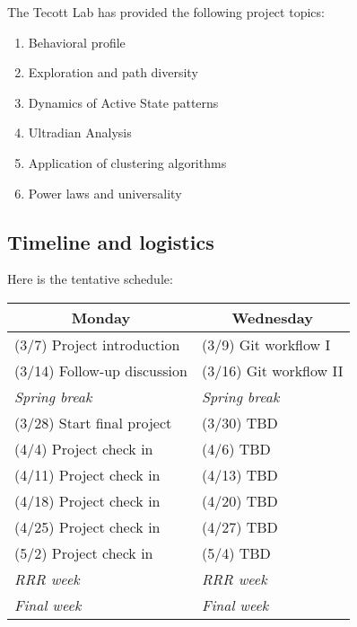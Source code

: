 \documentclass[11pt, oneside]{article}   	%
\begin{document}
The Tecott Lab has provided the following project topics:

\begin{enumerate}
\item Behavioral profile
\item Exploration and path diversity
\item Dynamics of Active State patterns
\item Ultradian Analysis
\item Application of clustering algorithms
\item Power laws and universality
\end{enumerate}

\subsection*{Timeline and logistics}

Here is the tentative schedule:

\begin{table}[h]
\centering
\begin{tabular}{@{}l|l@{}}
\toprule
\multicolumn{1}{c|}{Monday} & \multicolumn{1}{c}{Wednesday} \\
\hline
(3/7) Project introduction     & (3/9) Git workflow I \\
(3/14) Follow-up discussion    & (3/16) Git workflow II \\
\emph{\hspace{12mm} Spring break}  & \emph{\hspace{12mm} Spring break}\\
(3/28) Start final project     & (3/30) TBD\\
(4/4) Project check in         & (4/6) TBD\\
(4/11) Project check in        & (4/13) TBD\\
(4/18) Project check in        & (4/20) TBD\\
(4/25) Project check in        & (4/27) TBD\\
(5/2) Project check in         & (5/4) TBD\\
\emph{\hspace{12mm} RRR week}  & \emph{\hspace{12mm} RRR week}\\
\emph{\hspace{12mm} Final week}  & \emph{\hspace{12mm} Final week}\\
\bottomrule
\end{tabular}
\end{table}
\end{document}
